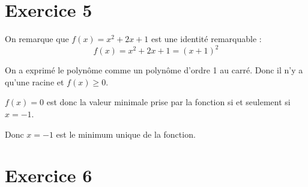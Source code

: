 \documentclass[9pt,professionalfonts,handout,hyperref]{beamer}
\begin{document}
\section{Exercice 5}

%
%
\begin{frame}

\pause On remarque que $f(x) = x^2+2x+1$ est une identité remarquable : \pause $$f(x) = x^2+2x+1= (x+1)^2$$


\pause On a exprimé le polynôme comme un polynôme d'ordre 1 au carré. \pause Donc il n'y a qu'une racine et $f(x)\ge0$. \newline

\pause $f(x)=0$ est donc la valeur minimale prise par la fonction si et seulement si $x=-1$. \newline

\pause Donc $x=-1$ est le minimum unique de la fonction.

\end{frame}


\section{Exercice 6}

%
%
\end{document}
